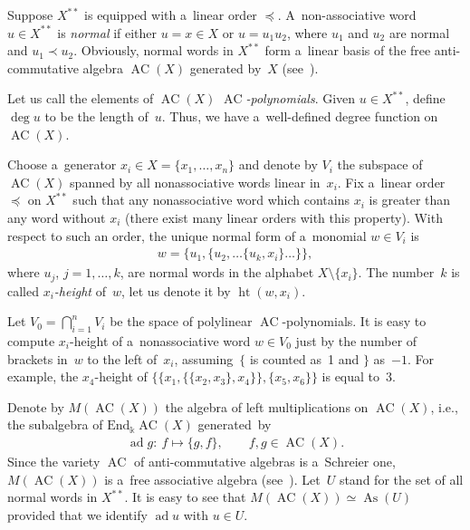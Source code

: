 \documentclass[pdftex]{sigma}
\DeclareMathOperator{\ad}{ad}
\begin{document}
Suppose $X^{**}$ is equipped with a~linear order $\preceq $.
A~non-associative word $u\in X^{**}$ is {\em normal} if either $u=x\in X$ or $u=u_1u_2$, where $u_1$ and $u_2$ are
normal and $u_1\prec u_2$.
Obviously, normal words in $X^{**}$ form a~linear basis of the free anti-commutative algebra $\operatorname{AC}(X)$ generated by~$X$
(see~\cite{BokutCL, ShirshovE}).

Let us call the elements of $\operatorname{AC}(X)$ {\em $\operatorname{AC}$-polynomials}.
Given $u\in X^{**}$, def\/ine $\deg u$ to be the length of~$u$.
Thus, we have a~well-def\/ined degree function on $\operatorname{AC}(X)$.

Choose a~generator $x_i\in X=\{x_1,\dots, x_n\}$ and denote by $V_i$ the subspace of $\operatorname{AC}(X)$ spanned by all
nonassociative words linear in~$x_i$.
Fix a~linear order $\preceq $ on $X^{**}$ such that any nonassociative word which contains $x_i$ is greater than any
word without $x_i$ (there exist many linear orders with this property).
With respect to such an order, the unique normal form of a~monomial $w\in V_i$ is
\begin{gather}
\label{eq:Normal-i-Form}
w = \{u_1, \{u_2, \dots \{u_k, x_i\}\dots\}\},
\end{gather}
where $u_j$, $j=1,\dots, k$, are normal words in the alphabet $X\setminus \{x_i\}$.
The number~$k$ is called {\em $x_i$-height} \cite{FarkasI} of~$w$, let us denote it by $\operatorname{ht}(w, x_i)$.

Let $V_0 = \bigcap\limits_{i=1}^n V_i$ be the space of polylinear $\operatorname{AC}$-polynomials.
It is easy to compute $x_i$-height of a~nonassociative word $w\in V_0$ just by the number of brackets in~$w$ to the left
of~$x_i$, assuming~$\{$ is counted as~1 and $\}$ as~$-1$.
For example, the $x_4$-height of $\{\{x_1, \{\{x_2, x_3\},x_4\} \},\{x_5,x_6\}\}$ is equal to~3.

Denote by $M(\operatorname{AC}(X))$ the algebra of left multiplications on $\operatorname{AC}(X)$, i.e., the subalgebra of $\mathrm{End}_\Bbbk
\operatorname{AC}(X)$ generated~by
\begin{gather*}
\ad g:  \ f\mapsto \{g,f\},
\qquad
f,g\in \operatorname{AC}(X).
\end{gather*}
Since the variety $\operatorname{AC}$ of anti-commutative algebras is a~Schreier one, $M(\operatorname{AC}(X))$ is a~free associative algebra
(see~\cite{Umirbaev1994}).
Let~$U$ stand for the set of all normal words in $X^{**}$.
It is easy to see that $M(\operatorname{AC}(X)) \simeq  \operatorname{As}(U)$ provided that we identify $\ad u$ with $u\in U$.
\end{document}
